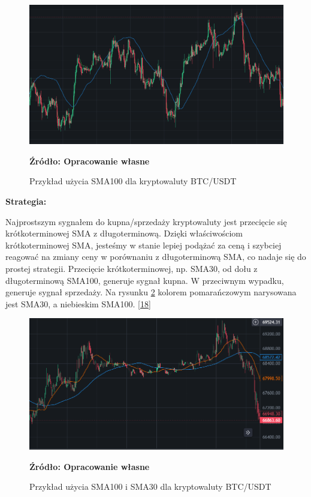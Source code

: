 \documentclass[12pt,a4paper,twoside, inzynierska]{pwr_wmat_praca_dyplomowa}
\theoremstyle{plain}
\numberwithin{theorem}{chapter}
\theoremstyle{definition}
\numberwithin{theorem}{chapter}
\begin{document}
	\vspace{12pt}	
	\begin{figure}[H]
		\centering
		\includegraphics[width=1\textwidth]{SMA100.png}
		\caption{Przykład użycia SMA100 dla kryptowaluty BTC/USDT}
		\label{fig:SMA100}
		\textbf{Źródło: Opracowanie własne}
	\end{figure}
	\vspace{12pt}
	
	\noindent \textbf{Strategia:}
	
	 Najprostszym sygnałem do kupna/sprzedaży kryptowaluty jest przecięcie się krótkoterminowej SMA z długoterminową. Dzięki właściwościom krótkoterminowej SMA, jesteśmy w stanie lepiej podążać za ceną i szybciej reagować na zmiany ceny w porównaniu z długoterminową SMA, co nadaje się do prostej strategii. Przecięcie krótkoterminowej, np. SMA30, od dołu z długoterminową SMA100, generuje sygnał kupna. W przeciwnym wypadku, generuje sygnał sprzedaży. Na rysunku \ref{fig:SMA100i30} kolorem pomarańczowym narysowana jest SMA30, a niebieskim SMA100.	\hyperref[info18]{[18]} 
	
	\begin{figure}[H]
		\centering
		\includegraphics[width=1\textwidth]{SMA100i30.png}
		\caption{Przykład użycia SMA100 i SMA30 dla kryptowaluty BTC/USDT}
		\label{fig:SMA100i30}
		\textbf{Źródło: Opracowanie własne}
	\end{figure}
	\vspace{12pt}
		 
\end{document}

